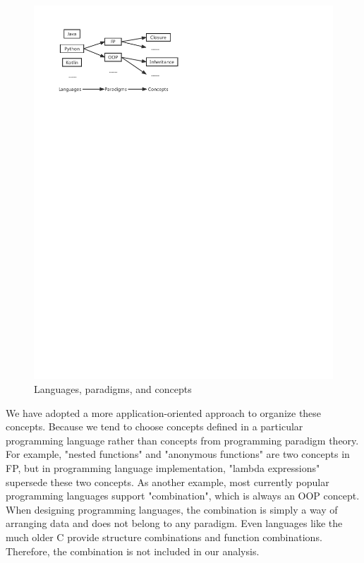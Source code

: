 \begin{figure}[htbp]
    \centerline{\includegraphics[scale=0.8]{figures/concept}}
    \caption{Languages, paradigms, and concepts}
    \label{fig:concept}
\end{figure}


We have adopted a more application-oriented approach to organize these concepts.
Because we tend to choose concepts defined in a particular programming
language rather than concepts from programming paradigm theory.
For example, "nested functions" and "anonymous functions" are two concepts in FP,
but in programming language implementation, "lambda expressions" supersede these two concepts.
As another example, most currently popular programming languages support "combination",
which is always an OOP concept.
When designing programming languages, the combination is simply a way of
arranging data and does not belong to any paradigm.
Even languages like the much older C provide structure combinations and
function combinations.
Therefore, the combination is not included in our analysis.

